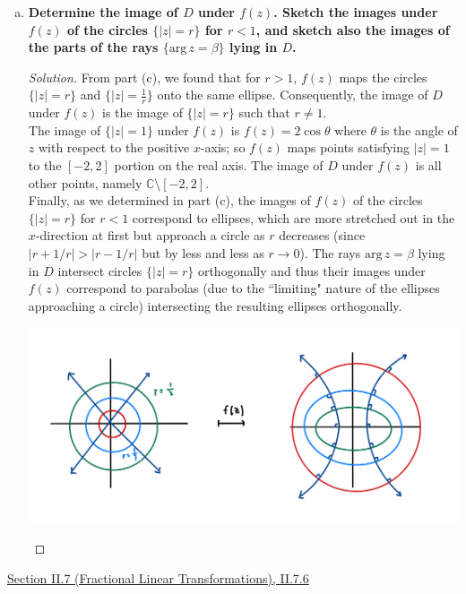 \documentclass[11pt]{article}
\newcommand{\C}{\mathbb{C}}
\newenvironment{solution}
  {\renewcommand\qedsymbol{$\blacksquare$}\begin{proof}[Solution]}
  {\end{proof}}
\theoremstyle{definition}
\begin{document}
\begin{enumerate}[a)]
\item \textbf{Determine the image of $D$ under $f(z)$. Sketch the images under $f(z)$ of the circles $\{|z| = r\}$ for $r < 1$, and sketch also the images of the parts of the rays $\{\mathrm{arg} \, z = \beta \}$ lying in $D$.}

\begin{solution} From part (c), we found that for $r > 1$, $f(z)$ maps the circles $\{|z| = r\}$ and $\{|z| = \frac{1}{r}\}$ onto the same ellipse. Consequently, the image of $D$ under $f(z)$ is the image of $\{|z| = r\}$ such that $r \neq 1$. \\

The image of $\{|z| = 1\}$ under $f(z)$ is $f(z) = 2\cos \theta$ where $\theta$ is the angle of $z$ with respect to the positive $x$-axis; so $f(z)$ maps points satisfying $|z| = 1$ to the $[-2, 2]$ portion on the real axis. 
The image of $D$ under $f(z)$ is all other points, namely $\boxed{\C \setminus [-2, 2]}.$  \\

Finally, as we determined in part (c), the images of $f(z)$ of the circles $\{|z| = r\}$ for $r < 1$ correspond to ellipses, which are more stretched out in the $x$-direction at first but approach a circle as $r$ decreases (since $|r+1/r| > |r-1/r|$ but by less and less as $r \rightarrow 0$). 
The rays $\mathrm{arg} \, z = \beta$ lying in $D$ intersect circles $\{|z| = r\}$ orthogonally and thus their images under $f(z)$ correspond to parabolas (due to the ``limiting" nature of the ellipses approaching a circle) intersecting the resulting ellipses orthogonally.
\begin{center}
\includegraphics*[scale = 0.2]{II.6.6.jpeg}
\end{center}

\end{solution}
\end{enumerate}
\newpage

\underline{Section II.7 (Fractional Linear Transformations), II.7.6} \\
\end{document}

